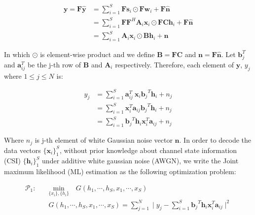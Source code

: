
\begin{equation}
\begin{aligned}
\mathbf{y} = \mathbf{F}\hat{\mathbf{y}} & =  \sum_{i=1}^{S} \mathbf{F}\mathbf{s}_i \odot  \mathbf{F}\mathbf{w}_i  + \mathbf{F} \hat{\mathbf{n}} \\  
      & = \sum_{i=1}^{S} \mathbf{F} \mathbf{F}^H \mathbf{A}_i\mathbf{x}_i\odot \mathbf{F}\mathbf{C}\mathbf{h}_i  + \mathbf{F} \hat{\mathbf{n}}\\   
      & = \sum_{i=1}^{S} \mathbf{A}_i \mathbf{x}_i \odot \mathbf{B} \mathbf{h}_i  + \mathbf{n} 
\end{aligned}
\end{equation}


In which $\odot$ is element-wise product and we define $\mathbf{B} = \mathbf{F}\mathbf{C}$ and $\mathbf{n} = \mathbf{F} \hat{\mathbf{n}}$. Let $\mathbf{b}_j^T$ and $\mathbf{a}_{ij}^T $ 
be the j-th row of $\mathbf{B}$ and $\mathbf{A}_i$ respectively. Therefore, each element of $\mathbf{y}$, $y_j$ where $1 \leq j \leq N$ is:


\begin{equation}
\label{dot}
\begin{aligned}
y_j & =  \sum_{i=1}^{S}\mathbf{a}_{ij}^T~\mathbf{x}_i {\mathbf{b}_j}^T \mathbf{h}_i + n_j\\
      & =  \sum_{i=1}^{S} \mathbf{x}_i ^T \mathbf{a}_{ij} {\mathbf{b}_j}^T \mathbf{h}_i + n_j\\ 
      & =  \sum_{i=1}^{S} {\mathbf{b}_j}^T \mathbf{h}_i \mathbf{x}_i ^T \mathbf{a}_{ij} + n_j
\end{aligned}
\end{equation}

Where $ n_j$ is j-th element of white Gaussian noise vector $\mathbf{n}$.
In order to decode the data vectors $\{\mathbf{x}_i\}_1^S$, without prior knowledge about channel state information (CSI) $\{\mathbf{h}_i\}_1^S$ under additive white gaussian noise (AWGN),
we write the Joint maximum likelihood (ML) estimation  as the following optimization problem:

\begin{equation}
\begin{aligned}
\mathcal{P}_1: \quad &\underset{\{x_i\},\{h_i\}}{\text{min}} \quad G(h_1, \cdots, h_S,x_1, \cdots, x_S)\\
& G(h_1, \cdots, h_S,x_1, \cdots, x_S) = \sum_{j=1}^{N} \mid y_j -  \sum_{i=1}^{S} {\mathbf{b}_j}^T \mathbf{h}_i \mathbf{x}_i ^T \mathbf{a}_{ij} \mid^2            
\end{aligned}
\end{equation}




